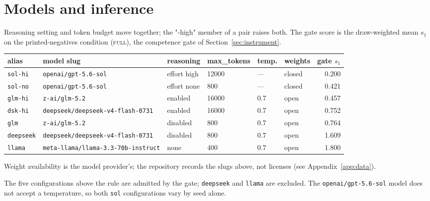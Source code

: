 \documentclass{article}
\theoremstyle{plain}
\theoremstyle{definition}
\theoremstyle{remark}
\newcommand{\cond}[1]{\textsc{#1}}   %
\begin{document}
\section{Models and inference}\label{app:models}

Reasoning setting and token budget move together; the "-high" member of a pair
raises both. The gate score is the draw-weighted mean $s_1$ on the printed-negatives condition
(\cond{full}), the competence gate of Section~\ref{sec:instrument}.

\begin{table}[h]
  \centering
  \footnotesize
  \setlength{\tabcolsep}{4pt}
  \begin{tabular}{llllll r}
    \toprule
    alias & model slug & reasoning & max\_tokens & temp. & weights & gate $s_1$ \\
    \midrule
    \texttt{sol-hi}   & \texttt{openai/gpt-5.6-sol}              & effort high     & 12000 & ---  & closed & 0.200 \\
    \texttt{sol-no}   & \texttt{openai/gpt-5.6-sol}              & effort none     & 800   & ---  & closed & 0.421 \\
    \texttt{glm-hi}   & \texttt{z-ai/glm-5.2}                    & enabled         & 16000 & 0.7  & open   & 0.457 \\
    \texttt{dsk-hi}   & \texttt{deepseek/deepseek-v4-flash-0731} & enabled         & 16000 & 0.7  & open   & 0.752 \\
    \texttt{glm}      & \texttt{z-ai/glm-5.2}                    & disabled        & 800   & 0.7  & open   & 0.764 \\
    \midrule
    \texttt{deepseek} & \texttt{deepseek/deepseek-v4-flash-0731} & disabled        & 800   & 0.7  & open   & 1.609 \\
    \texttt{llama}   & \texttt{meta-llama/llama-3.3-70b-instruct}& none           & 400   & 0.7  & open   & 1.800 \\
    \bottomrule
  \end{tabular}

  {\footnotesize Weight availability is the model provider's; the repository
  records the slugs above, not licenses (see Appendix~\ref{app:data}).}
\end{table}

The five configurations above the rule are admitted by the gate; \texttt{deepseek}
and \texttt{llama} are excluded. The \texttt{openai/gpt-5.6-sol} model does not
accept a temperature, so both \texttt{sol} configurations vary by seed alone.
\end{document}
